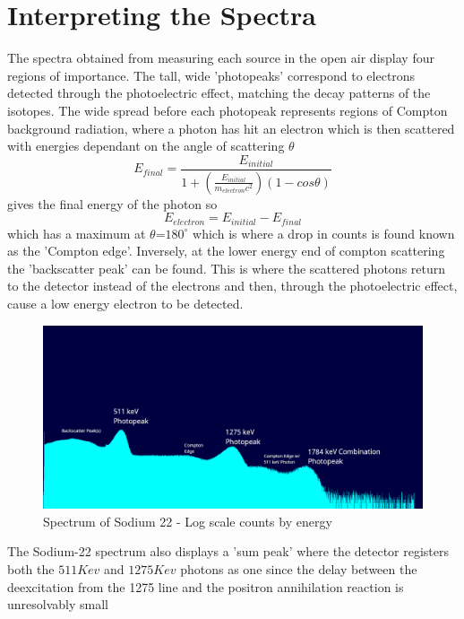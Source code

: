 \documentclass[12pt, a4paper]{article}
\begin{document}
\section{Interpreting the Spectra}
The spectra obtained from measuring each source in the open air display four regions of importance. The tall, wide 'photopeaks' correspond to electrons detected through the photoelectric effect, matching the decay patterns of the isotopes. The wide spread before each photopeak represents regions of Compton background radiation, where a photon has hit an electron which is then scattered with energies dependant on the angle of scattering $\theta$
	\begin{equation}
		E_{final} = \frac{E_{initial}}{1+(\frac{E_{initial}}{m_{electron}c^{2}})(1-cos\theta)}
	\end{equation}
gives the final energy of the photon so
	\begin{equation}
	E_{electron} = E_{initial}-E_{final}
	\end{equation}
which has a maximum at $\theta$=$180^{\circ}$ which is where a drop in counts is found known as the 'Compton edge'. Inversely, at the lower energy end of compton scattering the 'backscatter peak' can be found. This is where the scattered photons return to the detector instead of the electrons and then, through the photoelectric effect, cause a low energy electron to be detected.
\begin{figure}[H] \centering
		\includegraphics[scale=0.3]{assets/na22_log_annotated.png}
		\caption{Spectrum of Sodium 22 - Log scale counts by energy}
	\end{figure}
The Sodium-22 spectrum also displays a 'sum peak' where the detector registers both the $511\unit{Kev}$ and $1275\unit{Kev}$ photons as one since the delay between the deexcitation from the 1275 line and the positron annihilation reaction is unresolvably small
\end{document}
